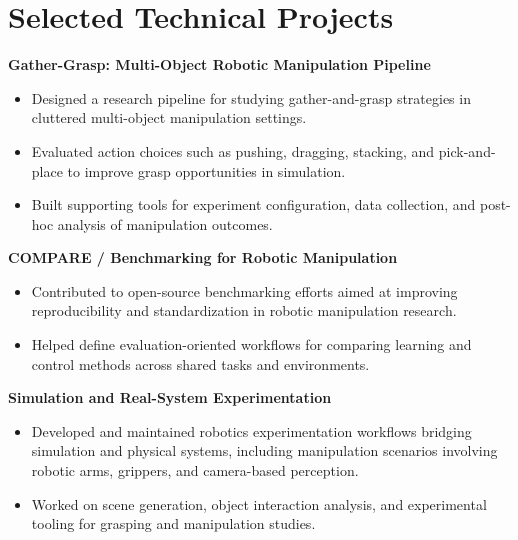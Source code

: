 \documentclass[a4paper,10pt]{article}
\begin{document}
\section*{Selected Technical Projects}

\textbf{Gather-Grasp: Multi-Object Robotic Manipulation Pipeline}
\begin{itemize}
    \item Designed a research pipeline for studying gather-and-grasp strategies in cluttered multi-object manipulation settings.
    \item Evaluated action choices such as pushing, dragging, stacking, and pick-and-place to improve grasp opportunities in simulation.
    \item Built supporting tools for experiment configuration, data collection, and post-hoc analysis of manipulation outcomes.
\end{itemize}

\textbf{COMPARE / Benchmarking for Robotic Manipulation}
\begin{itemize}
    \item Contributed to open-source benchmarking efforts aimed at improving reproducibility and standardization in robotic manipulation research.
    \item Helped define evaluation-oriented workflows for comparing learning and control methods across shared tasks and environments.
\end{itemize}

\textbf{Simulation and Real-System Experimentation}
\begin{itemize}
    \item Developed and maintained robotics experimentation workflows bridging simulation and physical systems, including manipulation scenarios involving robotic arms, grippers, and camera-based perception.
    \item Worked on scene generation, object interaction analysis, and experimental tooling for grasping and manipulation studies.
\end{itemize}
\end{document}
